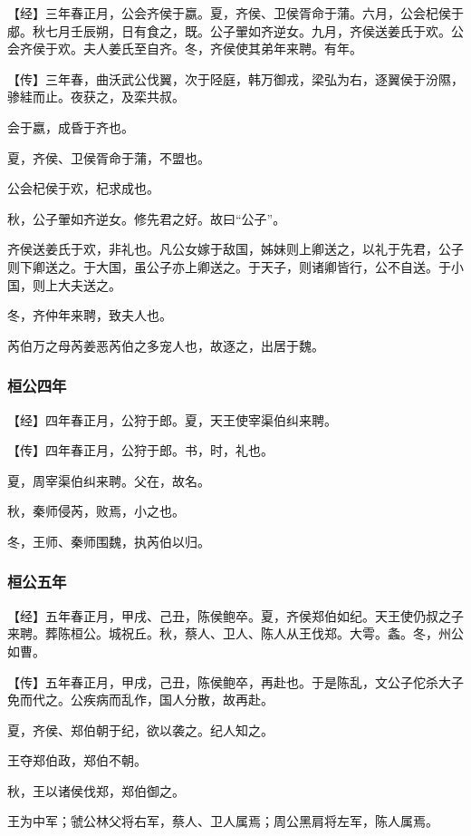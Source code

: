 \documentclass[]{article}
\begin{document}
【经】三年春正月，公会齐侯于嬴。夏，齐侯、卫侯胥命于蒲。六月，公会杞侯于郕。秋七月壬辰朔，日有食之，既。公子翬如齐逆女。九月，齐侯送姜氏于欢。公会齐侯于欢。夫人姜氏至自齐。冬，齐侯使其弟年来聘。有年。

【传】三年春，曲沃武公伐翼，次于陉庭，韩万御戎，梁弘为右，逐翼侯于汾隰，骖絓而止。夜获之，及栾共叔。

会于嬴，成昏于齐也。

夏，齐侯、卫侯胥命于蒲，不盟也。

公会杞侯于欢，杞求成也。

秋，公子翬如齐逆女。修先君之好。故曰``公子''。

齐侯送姜氏于欢，非礼也。凡公女嫁于敌国，姊妹则上卿送之，以礼于先君，公子则下卿送之。于大国，虽公子亦上卿送之。于天子，则诸卿皆行，公不自送。于小国，则上大夫送之。

冬，齐仲年来聘，致夫人也。

芮伯万之母芮姜恶芮伯之多宠人也，故逐之，出居于魏。

\hypertarget{header-n198}{%
\subsubsection{桓公四年}\label{header-n198}}

【经】四年春正月，公狩于郎。夏，天王使宰渠伯纠来聘。

【传】四年春正月，公狩于郎。书，时，礼也。

夏，周宰渠伯纠来聘。父在，故名。

秋，秦师侵芮，败焉，小之也。

冬，王师、秦师围魏，执芮伯以归。

\hypertarget{header-n206}{%
\subsubsection{桓公五年}\label{header-n206}}

【经】五年春正月，甲戌、己丑，陈侯鲍卒。夏，齐侯郑伯如纪。天王使仍叔之子来聘。葬陈桓公。城祝丘。秋，蔡人、卫人、陈人从王伐郑。大雩。螽。冬，州公如曹。

【传】五年春正月，甲戌，己丑，陈侯鲍卒，再赴也。于是陈乱，文公子佗杀大子免而代之。公疾病而乱作，国人分散，故再赴。

夏，齐侯、郑伯朝于纪，欲以袭之。纪人知之。

王夺郑伯政，郑伯不朝。

秋，王以诸侯伐郑，郑伯御之。

王为中军；虢公林父将右军，蔡人、卫人属焉；周公黑肩将左军，陈人属焉。
\end{document}
